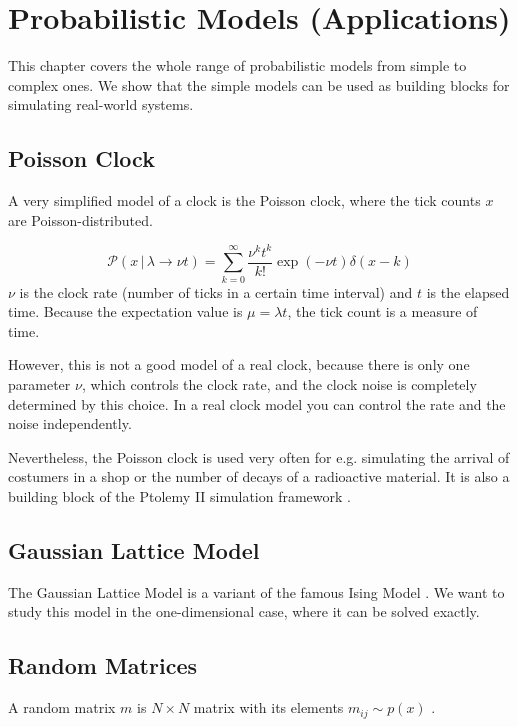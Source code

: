 \documentclass{tstextbook}
\begin{document}
\chapter{Probabilistic Models (Applications)}

\begin{summary}
  This chapter covers the whole range of probabilistic models from simple to complex ones. We show that the simple models can be used as building blocks for simulating real-world systems.
\end{summary}

\section{Poisson Clock}
A very simplified model of a clock is the Poisson clock, where the tick counts $x$ are Poisson-distributed.

\begin{definition}
  \label{th:poissonclock}
  \begin{equation}
    \mathcal{P}(x\,\vert\, \lambda\rightarrow\nu t)=\sum_{k=0}^{\infty}\frac{\nu^k t^k}{k!}\exp(-\nu t)\delta(x-k)
  \end{equation}
  $\nu$ is the clock rate (number of ticks in a certain time interval) and $t$ is the elapsed time. Because the expectation value is $\mu=\lambda t$, the tick count is a measure of time.
\end{definition}
However, this is not a good model of a real clock, because there is only one parameter $\nu$, which controls the clock rate, and the clock noise is completely determined by this choice. In a real clock model you can control the rate and the noise independently.

Nevertheless, the Poisson clock is used very often for e.g. simulating the arrival of costumers in a shop or the number of decays of a radioactive material. It is also a building block of the Ptolemy II simulation framework \cite{ptolemy2003}. 
\section{Gaussian Lattice Model}
The Gaussian Lattice Model is a variant of the famous Ising Model \cite{mussardo2010}. We want to study this model in the one-dimensional case, where it can be solved exactly.

\section{Random Matrices}
A random matrix $m$ is $N\times N$ matrix with its elements $m_{ij}\sim p(x)$ \cite{livan2017}.


\printbibliography{}


\printindex
\end{document}
